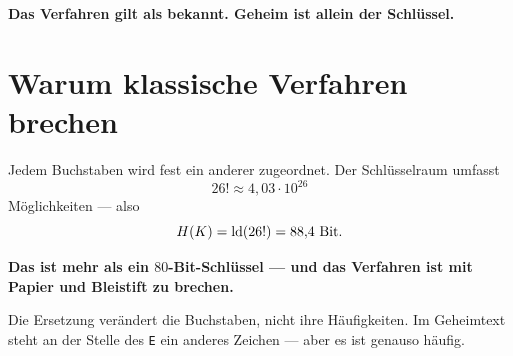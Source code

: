 \begin{merksatz}
\begin{center}
\begin{minipage}{0.9\textwidth}
\textbf{Das Verfahren gilt als bekannt. Geheim ist allein der Schlüssel.}
\end{minipage}
\end{center}

\begin{center}
\begin{minipage}{0.88\textwidth}
\end{minipage}
\end{center}
\end{merksatz}

\section{Warum klassische Verfahren brechen}

\begin{merksatz}
Jedem Buchstaben wird fest ein anderer zugeordnet. Der Schlüsselraum umfasst
\[ 26! \approx 4{,}03\cdot10^{26} \]
Möglichkeiten --- also
\[ H(K) = \operatorname{ld}(26!) = 88{,}4 \ \text{Bit} . \]

\begin{center}
\begin{minipage}{0.9\textwidth}
\textbf{Das ist mehr als ein $80$-Bit-Schlüssel --- und das Verfahren ist mit Papier und Bleistift zu brechen.}
\end{minipage}
\end{center}

Die Ersetzung verändert die Buchstaben, nicht ihre Häufigkeiten. Im Geheimtext steht an der Stelle des \texttt{E} ein anderes Zeichen --- aber es ist genauso häufig.

\begin{center}
\begin{minipage}{0.88\textwidth}
\end{minipage}
\end{center}
\end{merksatz}

